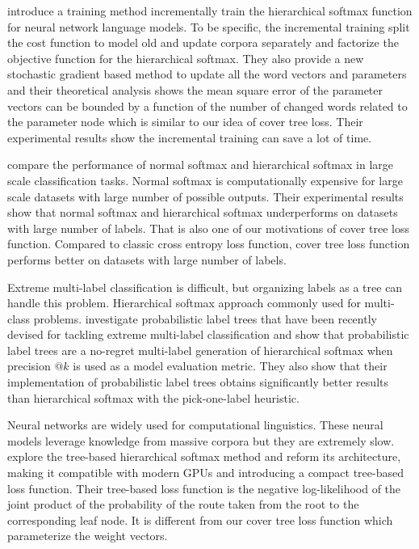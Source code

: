 \documentclass[10pt]{article}
\theoremstyle{definition}
\begin{document}
\cite{Peng2017IncrementallyLT} introduce a training method incrementally train the hierarchical softmax function for neural network language models. 
To be specific, the incremental training split the cost function to model old and update corpora separately and factorize the objective function for the hierarchical softmax. 
They also provide a new stochastic gradient based method to update all the word vectors and parameters and their theoretical analysis shows the mean square error of the parameter vectors can be bounded by a function of the number of changed words related to the parameter node which is similar to our idea of cover tree loss.
Their experimental results show the incremental training can save a lot of time.

\cite{Mohammed2018EffectivenessOH} compare the performance of normal softmax and hierarchical softmax in large scale classification tasks. 
Normal softmax is computationally expensive for large scale datasets with large number of possible outputs.
Their experimental results show that normal softmax and hierarchical softmax underperforms on datasets with large number of labels.
That is also one of our motivations of cover tree loss function. 
Compared to classic cross entropy loss function, cover tree loss function performs better on datasets with large number of labels.

Extreme multi-label classification is difficult, but organizing labels as a tree can handle this problem. 
Hierarchical softmax approach commonly used for multi-class problems.
\cite{Wydmuch2018ANG} investigate probabilistic label trees that have been recently devised for tackling extreme multi-label classification and show that probabilistic label trees are a no-regret multi-label generation of hierarchical softmax when precision $@k$ is used as a model evaluation metric.
They also show that their implementation of probabilistic label trees obtains significantly better results than hierarchical softmax with the pick-one-label heuristic.

Neural networks are widely used for computational linguistics.
These neural models leverage knowledge from massive corpora but they are extremely slow.
\cite{Jiang2017ExplorationOT} explore the tree-based hierarchical softmax method and reform its architecture, making it compatible
with modern GPUs and introducing a compact tree-based loss function.
Their tree-based loss function is the negative log-likelihood of the joint product of the probability of the route taken from the root to the corresponding leaf node. 
It is different from our cover tree loss function which parameterize the weight vectors. 
\end{document}
